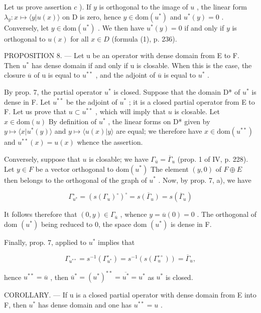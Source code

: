 Let us prove assertion \(c\) ). If \(y\) is orthogonal to the image of \(u\) , the linear form \(\lambda_y: x \mapsto \langle y | u(x) \rangle\) on D is zero, hence \(y \in \text{dom}(u^*)\) and \(u^*(y) = 0\) . Conversely, let \(y \in \text{dom}(u^*)\) . We then have \(u^*(y) = 0\) if and only if \(y\) is orthogonal to \(u(x)\) for all \(x \in D\) (formula (1), p. 236).

PROPOSITION 8. --- Let u be an operator with dense domain from E to F. Then \(u^{*}\) has dense domain if and only if u is closable. When this is the case, the closure \(\overline{u}\) of u is equal to \(u^{**}\) , and the adjoint of \(\overline{u}\) is equal to \(u^{*}\) .

By prop. 7, the partial operator \(u^*\) is closed. Suppose that the domain D* of \(u^*\) is dense in F. Let \(u^{**}\) be the adjoint of \(u^*\) ; it is a closed partial operator from E to F. Let us prove that \(u \subset u^{**}\) , which will imply that \(u\) is closable. Let \(x \in \text{dom}(u)\) By definition of \(u^*\) , the linear forms on D* given by \(y \mapsto \langle x | u^*(y) \rangle\) and \(y \mapsto \langle u(x) | y \rangle\) are equal; we therefore have \(x \in \text{dom}(u^{**})\) and \(u^{**}(x) = u(x)\) whence the assertion.

Conversely, suppose that \(u\) is closable; we have \(\Gamma_{\overline{u}} = \overline{\Gamma}_u\) (prop. 1 of IV, p. 228). Let \(y \in F\) be a vector orthogonal to \(\mathrm{dom}(u^*)\) The element \((y,0)\) of \(F \oplus E\) then belongs to the orthogonal of the graph of \(u^*\) . Now, by prop. 7, a), we have

\[
\Gamma_ {u ^ {*}} ^ {\circ} = (s (\Gamma_ {u}) ^ {\circ}) ^ {\circ} = \overline {{s (\Gamma_ {u})}} = s (\overline {{\Gamma}} _ {u})
\]

It follows therefore that \((0,y)\in\Gamma_{\overline{u}}\) , whence \(y=\overline{u}(0)=0\) . The orthogonal of dom \((u^{*})\) being reduced to 0, the space dom \((u^{*})\) is dense in F.

Finally, prop. 7, applied to \(u^{*}\) implies that

\[
\Gamma_ {u ^ {* *}} = s ^ {- 1} (\Gamma_ {u ^ {*}} ^ {\circ}) = s ^ {- 1} (s (\Gamma_ {u} ^ {\circ \circ})) = \overline {{\Gamma}} _ {u},
\]

hence \(u^{**} = \overline{u}\) , then \(\overline{u}^{*} = (u^{*})^{**} = \overline{u^{*}} = u^{*}\) as \(u^{*}\) is closed.

COROLLARY. --- If u is a closed partial operator with dense domain from E into F, then \(u^{*}\) has dense domain and one has \(u^{**} = u\) .

